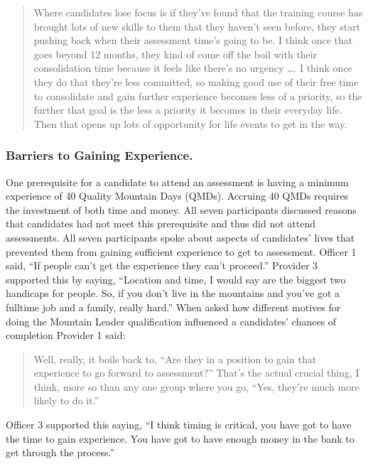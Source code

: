 \documentclass[
  12pt,
  a4paper,
]{book}
\begin{document}
\begin{quote}
Where candidates lose focus is if they've found that the training course has brought lots of new skills to them that they haven't seen before, they start pushing back when their assessment time's going to be. I think once that goes beyond 12 months, they kind of come off the boil with their consolidation time because it feels like there's no urgency \ldots. I think once they do that they're less committed, so making good use of their free time to consolidate and gain further experience becomes less of a priority, so the further that goal is the less a priority it becomes in their everyday life. Then that opens up lots of opportunity for life events to get in the way.
\end{quote}

\hypertarget{qual-gta-gaining-experience}{%
\subsubsection{Barriers to Gaining Experience.}\label{qual-gta-gaining-experience}}

One prerequisite for a candidate to attend an assessment is having a minimum experience of 40 Quality Mountain Days (QMDs). Accruing 40 QMDs requires the investment of both time and money. All seven participants discussed reasons that candidates had not meet this prerequisite and thus did not attend assessments. All seven participants spoke about aspects of candidates' lives that prevented them from gaining sufficient experience to get to assessment. Officer 1 said, ``If people can't get the experience they can't proceed.'' Provider 3 supported this by saying, ``Location and time, I would say are the biggest two handicaps for people. So, if you don't live in the mountains and you've got a fulltime job and a family, really hard.'' When asked how different motives for doing the Mountain Leader qualification influenced a candidates' chances of completion Provider 1 said:

\begin{quote}
Well, really, it boils back to, ``Are they in a position to gain that experience to go forward to assessment?'' That's the actual crucial thing, I think, more so than any one group where you go, ``Yes, they're much more likely to do it.''
\end{quote}

Officer 3 supported this saying, ``I think timing is critical, you have got to have the time to gain experience. You have got to have enough money in the bank to get through the process.''
\end{document}

